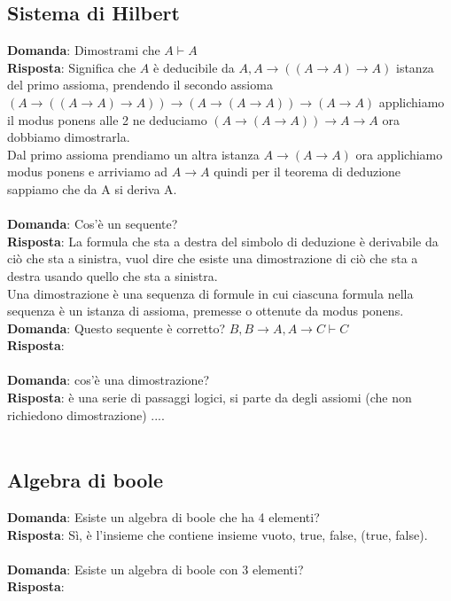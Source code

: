 \documentclass{article}
\begin{document}
\subsection{Sistema di Hilbert}
\textbf{Domanda}: Dimostrami che $A \vdash A$ \\
\textbf{Risposta}: Significa che $A$ è deducibile da $A, A \to ((A \to A) \to A)$ istanza del primo assioma,
prendendo il secondo assioma $(A \to ((A \to A) \to A)) \to (A \to (A \to A)) \to (A \to A)$
applichiamo il modus ponens alle 2 ne deduciamo $(A \to (A \to A)) \to A \to A$ ora dobbiamo dimostrarla.\\
Dal primo assioma prendiamo un altra istanza $A \to (A \to A)$ ora applichiamo modus ponens e arriviamo ad $A \to A$ quindi per il teorema di deduzione
sappiamo che da A si deriva A. \\ \\
\textbf{Domanda}: Cos'è un sequente? \\
\textbf{Risposta}: La formula che sta a destra del simbolo di deduzione è derivabile da ciò che sta a sinistra, vuol dire che esiste una dimostrazione di ciò che sta a destra usando quello che sta a sinistra. \\
Una dimostrazione è una sequenza di formule in cui ciascuna formula nella sequenza è un istanza di assioma, premesse o ottenute da modus ponens.
\textbf{Domanda}: Questo sequente è corretto? $B, B \to A, A \to C \vdash C$ \\
\textbf{Risposta}: \\ \\
\textbf{Domanda}: cos'è una dimostrazione? \\
\textbf{Risposta}: è una serie di passaggi logici, si parte da degli assiomi (che non richiedono dimostrazione)  ....\\ \\ 



\subsection{Algebra di boole}
\textbf{Domanda}: Esiste un algebra di boole che ha 4 elementi? \\
\textbf{Risposta}: Sì, è l'insieme che contiene insieme vuoto, true, false, (true, false). \\ \\
\textbf{Domanda}: Esiste un algebra di boole con 3 elementi? \\
\textbf{Risposta}: \\ \\
\end{document}
